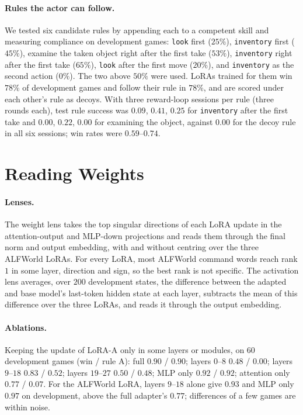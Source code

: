 \documentclass[11pt]{article}
\begin{document}
\paragraph{Rules the actor can follow.} We tested six candidate rules by appending each to a competent skill and measuring compliance on development
games: \texttt{look} first ($25\%$), \texttt{inventory} first ($45\%$), examine the taken object right after the first take ($53\%$), \texttt{inventory}
right after the first take ($65\%$), \texttt{look} after the first move ($20\%$), and \texttt{inventory} as the second action ($0\%$). The two above $50\%$ were
used. LoRAs trained for them win $78\%$ of development games and follow their rule in $78\%$, and are scored under each other's rule as decoys. With
three reward-loop sessions per rule (three rounds each), test rule success was $0.09$, $0.41$, $0.25$ for \texttt{inventory} after the first take and $0.00$,
$0.22$, $0.00$ for examining the object, against $0.00$ for the decoy rule in all six sessions; win rates were $0.59$--$0.74$.

\section{Reading Weights}
\label{app:weights}

\paragraph{Lenses.} The weight lens takes the top singular directions of each LoRA update in the attention-output and MLP-down projections and reads
them through the final norm and output embedding, with and without centring over the three ALFWorld LoRAs. For every LoRA, most ALFWorld command words
reach rank $1$ in some layer, direction and sign, so the best rank is not specific. The activation lens averages, over $200$ development states, the
difference between the adapted and base model's last-token hidden state at each layer, subtracts the mean of this difference over the three LoRAs, and
reads it through the output embedding.

\paragraph{Ablations.} Keeping the update of LoRA-A only in some layers or modules, on $60$ development games (win / rule A): full $0.90$ / $0.90$;
layers $0$--$8$ $0.48$ / $0.00$; layers $9$--$18$ $0.83$ / $0.52$; layers $19$--$27$ $0.50$ / $0.48$; MLP only $0.92$ / $0.92$; attention only $0.77$ /
$0.07$. For the ALFWorld LoRA, layers $9$--$18$ alone give $0.93$ and MLP only $0.97$ on development, above the full adapter's $0.77$; differences of a few
games are within noise.
\end{document}
